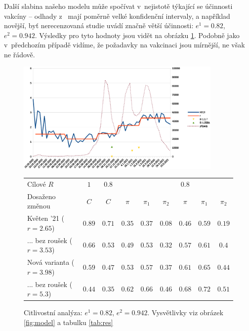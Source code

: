 Další slabina našeho modelu může spočívat v~nejistotě týkající se účinnosti vakcíny
-- odhady z~\cite{Hall_etal2021} mají poměrně velké konfidenční
intervaly, a například novější, byť nerecenzovaná studie \cite{Shapiro_etal2021}
uvádí značně větší účinnosti: $e^{1}=0.82$, $e^{2}=0.942$. Výsledky pro tyto hodnoty jsou vidět na obrázku \ref{fig:cv}. Podobně jako v~předchozím případě vidíme, že požadavky na vakcinaci jsou mírnější, ne však ne řádově.

\begin{figure}
\begin{center}
\includegraphics[width=10cm]{pic/wholee} 

\begin{tabular}{l|c|c|ccc|ccc}									
Cílové $R$	& $1$	& $0.8$	&	&	&	& $0.8$	&	&	\\ 
Dosaženo změnou	& $C$	& $C$	& $\pi$	& $\pi_1$	& $\pi_2$	& $\pi$	& $\pi_1$	& $\pi_2$	\\ \hline
Květen '21 ($r=2.65$)	& $0.89$	& $0.71$	& $0.35$	& $0.37$	& $0.08$	& $0.46$	& $0.59$	& $0.19$	\\
... bez roušek ($r=3.53$)	& $0.66$	& $0.53$	& $0.49$	& $0.53$	& $0.32$	& $0.57$	& $0.61$	& $0.4$	\\
Nová varianta ($r=3.98$)	& $0.59$	& $0.47$	& $0.53$	& $0.57$	& $0.37$	& $0.61$	& $0.65$	& $0.44$	\\
... bez roušek ($r=5.3$)	& $0.44$	& $0.35$	& $0.62$	& $0.66$	& $0.46$	& $0.68$	& $0.72$	& $0.51$
\end{tabular}									

\caption{Citlivostní analýza: $e^{1}=0.82$, $e^{2}=0.942.$ Vysvětlivky viz obrázek \ref{fig:model} a tabulku \ref{tab:res}}
\label{fig:cv}

\end{center}
\end{figure}


